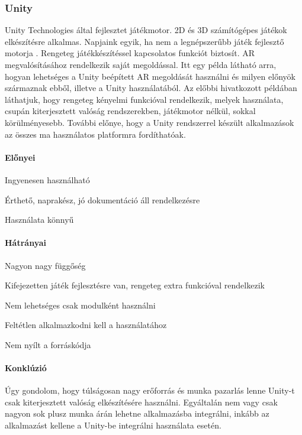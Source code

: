 \documentclass[12pt,a4paper,oneside]{report} %
\begin{document}
\subsubsection{Unity}
Unity Technologies által fejlesztet játékmotor. 2D és 3D számítógépes játékok elkészítésre alkalmas. Napjaink egyik, ha nem a legnépszerűbb játék fejlesztő motorja \cite{haas2014history}.
Rengeteg játékkészítéssel kapcsolatos funkciót biztosít. AR megvalósításához rendelkezik saját megoldással. Itt \cite{kim2014using} egy példa látható arra, hogyan lehetséges a Unity beépített AR megoldását használni és milyen előnyök származnak ebből, illetve a Unity használatából. Az előbbi hivatkozott példában láthatjuk, hogy rengeteg kényelmi funkcióval rendelkezik, melyek használata, csupán kiterjesztett valóság rendszerekben, játékmotor nélkül, sokkal körülményesebb.  További előnye, hogy a Unity rendszerrel készült alkalmazások az összes ma használatos platformra fordíthatóak. 
\paragraph{Előnyei} 
\begin{compactitem}
	\item Ingyenesen használható
	\item Érthető, naprakész, jó dokumentáció áll rendelkezésre
	\item Használata könnyű
\end{compactitem}
\paragraph{Hátrányai} 
\begin{compactitem}
	\item Nagyon nagy függőség
	\item Kifejezetten játék fejlesztésre van, rengeteg extra funkcióval rendelkezik
	\item Nem lehetséges csak modulként használni
	\item Feltétlen alkalmazkodni kell a használatához
	\item Nem nyílt a forráskódja
\end{compactitem}
\paragraph{Konklúzió}
Úgy gondolom, hogy túlságosan nagy erőforrás és munka pazarlás lenne Unity-t csak kiterjesztett valóság elkészítésére használni. Egyáltalán nem vagy csak nagyon sok plusz munka árán lehetne alkalmazásba integrálni, inkább az alkalmazást kellene a Unity-be integrálni használata esetén.
\end{document}
